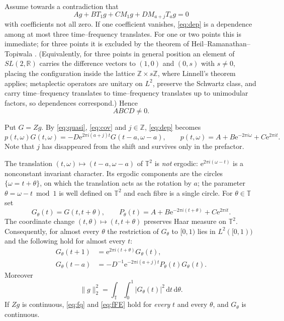 \documentclass[11pt]{amsart}
\theoremstyle{remark}
\newcommand{\R}{\mathbb R}
\newcommand{\Z}{\mathbb Z}
\newcommand{\T}{\mathbb T}
\newcommand{\e}{\mathrm e}
\newcommand{\dd}{\,\mathrm d}
\begin{document}
Assume towards a contradiction that
\begin{equation}\label{eq:dep}
Ag+BT_1g+CM_1g+DM_{a+j}T_ag=0
\end{equation}
with coefficients not all zero. If one coefficient vanishes, \eqref{eq:dep} is a dependence
among at most three time--frequency translates. For one or two points this is immediate; for
three points it is excluded by the theorem of Heil--Ramanathan--Topiwala \cite{HRT}.
(Equivalently, for three points in general position an element of $SL(2,\R)$ carries the
difference vectors to $(1,0)$ and $(0,s)$ with $s\neq0$, placing the configuration inside the
lattice $\Z\times s\Z$, where Linnell's theorem \cite{Lin} applies; metaplectic operators are
unitary on $L^2$, preserve the Schwartz class, and carry time--frequency translates to
time--frequency translates up to unimodular factors, so dependences correspond.) Hence
\begin{equation}\label{eq:nonzero}
ABCD\neq0 .
\end{equation}

Put $G=Zg$. By \eqref{eq:quasi}, \eqref{eq:cov} and $j\in\Z$, \eqref{eq:dep} becomes
\begin{equation}\label{eq:FE}
p(t,\omega)G(t,\omega)=-D\e^{2\pi i(a+j)t}G(t-a,\omega-a),
\qquad p(t,\omega)=A+B\e^{-2\pi i\omega}+C\e^{2\pi it}.
\end{equation}
Note that $j$ has disappeared from the shift and survives only in the prefactor.

The translation $(t,\omega)\mapsto(t-a,\omega-a)$ of $\T^2$ is \emph{not} ergodic:
$\e^{2\pi i(\omega-t)}$ is a nonconstant invariant character. Its ergodic components are the
circles $\{\omega=t+\theta\}$, on which the translation acts as the rotation by $a$; the
parameter $\theta=\omega-t\bmod1$ is well defined on $\T^2$ and each fibre is a single circle.
For $\theta\in\T$ set
\[
G_\theta(t)=G(t,t+\theta),\qquad
P_\theta(t)=A+B\e^{-2\pi i(t+\theta)}+C\e^{2\pi it}.
\]
The coordinate change $(t,\theta)\mapsto(t,t+\theta)$ preserves Haar measure on $\T^2$.
Consequently, for almost every $\theta$ the restriction of $G_\theta$ to $[0,1)$ lies in
$L^2([0,1))$ and the following hold for almost every $t$:
\begin{align}
G_\theta(t+1)&=\e^{2\pi i(t+\theta)}G_\theta(t),\label{eq:fq}\\
G_\theta(t-a)&=-D^{-1}\e^{-2\pi i(a+j)t}P_\theta(t)G_\theta(t).\label{eq:fFE}
\end{align}
Moreover
\begin{equation}\label{eq:fubini}
\|g\|_2^2=\int_\T\int_0^1|G_\theta(t)|^2\dd t\dd\theta .
\end{equation}
If $Zg$ is continuous, \eqref{eq:fq} and \eqref{eq:fFE} hold for \emph{every} $t$ and every
$\theta$, and $G_\theta$ is continuous.
\end{document}
